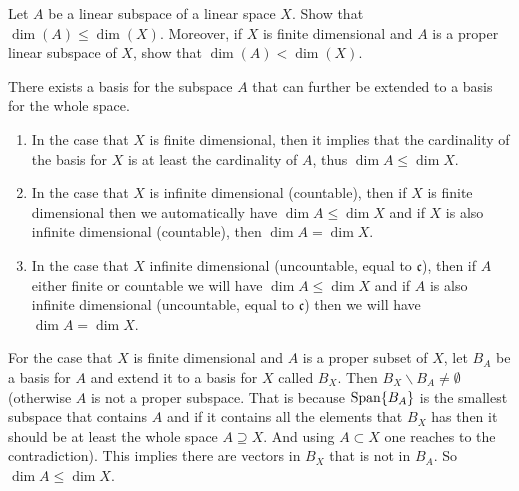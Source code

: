 \begin{problem}
	Let $ A $ be a linear subspace of a linear space $ X $. Show that $ \dim(A)\leq \dim(X) $. Moreover, if $ X $ is finite dimensional and $ A $ is a proper linear subspace of $ X $, show that $ \dim(A) < \dim(X) $.
\end{problem}
\begin{solution}
	There exists a basis for the subspace $ A $ that can further be extended to a basis for the whole space. 
	\begin{enumerate}
		\item In the case that $ X $ is finite dimensional, then it implies that the cardinality of the basis for $ X $ is at least the cardinality of $ A $, thus $ \dim A \leq \dim X $.
		\item In the case that $ X $ is infinite dimensional (countable), then if $ X $ is finite dimensional then we automatically have $ \dim A \leq \dim X $ and if $ X $ is also infinite dimensional (countable), then $ \dim A = \dim X $.
		\item In the case that $ X $ infinite dimensional (uncountable, equal to $ \mathfrak{c} $), then if $ A $ either finite or countable we will have $ \dim A \leq \dim X $ and if $ A $ is also infinite dimensional (uncountable, equal to $ \mathfrak{c} $) then we will have $ \dim A = \dim X $.
	\end{enumerate}
	
	For the case that $ X $ is finite dimensional and $ A $ is a proper subset of $ X $, let $ B_A $ be a basis for $ A $ and extend it to a basis for $ X $ called $ B_X $. Then $ B_X\backslash B_A \neq \emptyset $ (otherwise $ A $ is not a proper subspace. That is because $ \operatorname{Span}\{B_A\} $ is the smallest subspace that contains $ A $ and if it contains all the elements that $ B_X $ has then it should be at least the whole space $ A\supseteq X $. And using $ A\subset X $ one reaches to the contradiction). This implies there are vectors in $ B_X $ that is not in $ B_A $. So $ \dim A \leq \dim X $.
\end{solution}



